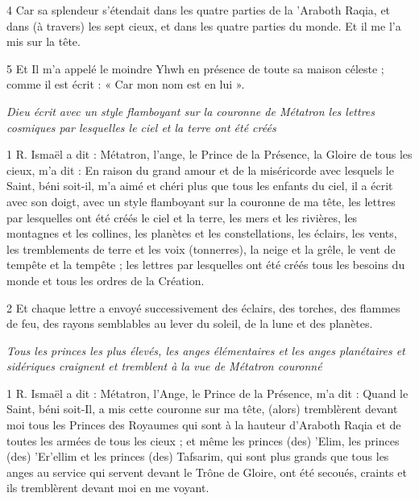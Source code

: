 \par 4 Car sa splendeur s'étendait dans les quatre parties de la 'Araboth Raqia, et dans (à travers) les sept cieux, et dans les quatre parties du monde. Et il me l'a mis sur la tête.

\par 5 Et Il m'a appelé le moindre Yhwh en présence de toute sa maison céleste ; comme il est écrit : « Car mon nom est en lui ».


\par \textit{Dieu écrit avec un style flamboyant sur la couronne de Métatron les lettres cosmiques par lesquelles le ciel et la terre ont été créés}

\par 1 R. Ismaël a dit : Métatron, l'ange, le Prince de la Présence, la Gloire de tous les cieux, m'a dit : En raison du grand amour et de la miséricorde avec lesquels le Saint, béni soit-il, m'a aimé et chéri plus que tous les enfants du ciel, il a écrit avec son doigt, avec un style flamboyant sur la couronne de ma tête, les lettres par lesquelles ont été créés le ciel et la terre, les mers et les rivières, les montagnes et les collines, les planètes et les constellations, les éclairs, les vents, les tremblements de terre et les voix (tonnerres), la neige et la grêle, le vent de tempête et la tempête ; les lettres par lesquelles ont été créés tous les besoins du monde et tous les ordres de la Création.

\par 2 Et chaque lettre a envoyé successivement des éclairs, des torches, des flammes de feu, des rayons semblables au lever du soleil, de la lune et des planètes.


\par \textit{Tous les princes les plus élevés, les anges élémentaires et les anges planétaires et sidériques craignent et tremblent à la vue de Métatron couronné}

\par 1 R. Ismaël a dit : Métatron, l'Ange, le Prince de la Présence, m'a dit : Quand le Saint, béni soit-Il, a mis cette couronne sur ma tête, (alors) tremblèrent devant moi tous les Princes des Royaumes qui sont à la hauteur d'Araboth Raqia et de toutes les armées de tous les cieux ; et même les princes (des) 'Elim, les princes (des) 'Er'ellim et les princes (des) Tafsarim, qui sont plus grands que tous les anges au service qui servent devant le Trône de Gloire, ont été secoués, craints et ils tremblèrent devant moi en me voyant.

